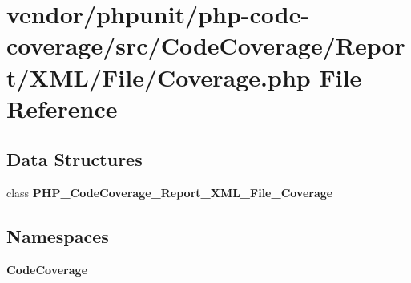 \section{vendor/phpunit/php-\/code-\/coverage/src/\+Code\+Coverage/\+Report/\+X\+M\+L/\+File/\+Coverage.php File Reference}
\label{_coverage_8php}
\subsection*{Data Structures}
\begin{DoxyCompactItemize}
\item 
class {\bf P\+H\+P\+\_\+\+Code\+Coverage\+\_\+\+Report\+\_\+\+X\+M\+L\+\_\+\+File\+\_\+\+Coverage}
\end{DoxyCompactItemize}
\subsection*{Namespaces}
\begin{DoxyCompactItemize}
\item 
 {\bf Code\+Coverage}
\end{DoxyCompactItemize}
